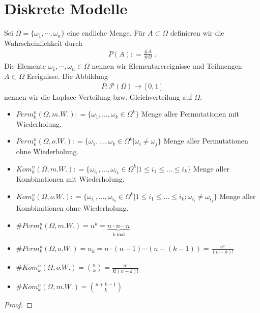 
\section{Diskrete Modelle}

\begin{Definition}
Sei $\Omega = \{ \omega_1, \cdots , \omega_n\}$ eine endliche Menge. Für $A \subset \Omega$ definieren wir die Wahrscheinlichkeit durch
\begin{align*}
P(A) : = \frac{\#A}{ \# \Omega} \; . 
\end{align*} 
Die Elemente $ \omega_1, \cdots , \omega_n \in \Omega$ nennen wir Elementarereignisse und Teilmengen $A \subset \Omega$ Ereignisse. Die Abbildung
\begin{align*}
P : \mathcal{P} (\Omega) \to [0,1]  
\end{align*}  
nennen wir die Laplace-Verteilung bzw. Gleichverteilung auf $\Omega$.
\end{Definition}


\begin{Definition}

\begin{itemize}
\item $Perm_k^n(\Omega, m.W.) : = \{ \omega_1, \ldots, \omega_k \in \Omega^k \}$  Menge aller Permutationen mit Wiederholung.
\item $Perm_k^n(\Omega, o.W.) : = \{ \omega_1, \ldots, \omega_k \in \Omega^k  | \omega_i \neq \omega_j\}$  Menge aller Permutationen ohne Wiederholung.
\item $Kom_k^n(\Omega, m.W.) : = \{ \omega_{i_1}, \ldots, \omega_{i_k} \in \Omega^k  | 1  \leq i_1 \leq  \ldots  \leq i_k \}$  Menge aller Kombinationen  mit Wiederholung.
\item $Kom_k^n(\Omega, o.W.) : = \{ \omega_{i_1}, \ldots, \omega_{i_k} \in \Omega^k  | 1 \leq i_1  \leq \ldots \leq i_k ;  \omega_{i_i} \neq \omega_{i_j} \}$  Menge aller Kombinationen  ohne  Wiederholung.
\end{itemize}
\end{Definition}

\begin{Lemma}
\begin{itemize}
\item $\# Perm_k^n(\Omega, m.W.)  = n^k = \underbrace{n \cdot n \cdots n}_{\text{k-mal}}$
\item $\# Perm_k^n(\Omega, o.W.)  = n_k = n \cdot (n-1) \cdots  (n-(k-1)) = \frac{n!}{(n-k)!}$  
\item $\#Kom_k^n(\Omega, o.W.) = \binom{n}{k} = \frac{n!}{k! (n-k)!}$  
\item $\#Kom_k^n(\Omega, m.W.)  = \binom{n + k -1}{k}$  
\end{itemize}
\end{Lemma}
\begin{proof}
\end{proof}


